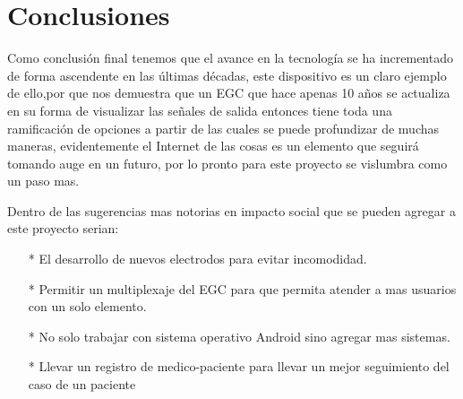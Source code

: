 \chapter{Conclusiones}
Como conclusión final tenemos que el avance en la tecnología se ha incrementado de forma ascendente en las últimas décadas, este dispositivo es un claro ejemplo de ello,por que nos demuestra que un EGC que hace apenas 10 años se actualiza en su forma de visualizar las señales de salida entonces tiene toda una ramificación de opciones a partir de las cuales se puede profundizar de muchas maneras, evidentemente el Internet de las cosas es un elemento que seguirá tomando auge en un futuro, por lo pronto para este proyecto se vislumbra como un paso mas.\newline

Dentro de las sugerencias mas notorias en impacto social que se pueden agregar a este proyecto serian:
\begin{itemize}
\item[*] El desarrollo de nuevos electrodos para evitar incomodidad.
\item[*] Permitir un multiplexaje del EGC para que permita atender a mas usuarios con un solo elemento.
\item[*] No solo trabajar con sistema operativo Android sino agregar mas sistemas.
\item[*] Llevar un registro de medico-paciente para llevar un mejor seguimiento del caso de un paciente
\end{itemize}